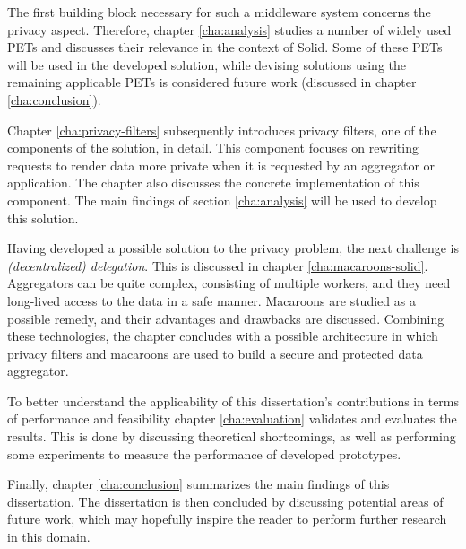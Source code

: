 The first building block necessary for such a middleware system concerns the privacy aspect. Therefore, chapter \ref{cha:analysis} studies a number of widely used \gls{PETs} and discusses their relevance in the context of Solid. Some of these \gls{PETs} will be used in the developed solution, while devising solutions using the remaining applicable \gls{PETs} is considered future work (discussed in chapter \ref{cha:conclusion}).

Chapter \ref{cha:privacy-filters} subsequently introduces privacy filters, one of the components of the solution, in detail. This component focuses on rewriting requests to render data more private when it is requested by an aggregator or application. The chapter also discusses the concrete implementation of this component. The main findings of section \ref{cha:analysis} will be used to develop this solution.

Having developed a possible solution to the privacy problem, the next challenge is \textit{(decentralized) delegation}. This is discussed in chapter \ref{cha:macaroons-solid}. Aggregators can be quite complex, consisting of multiple workers, and they need long-lived access to the data in a safe manner. Macaroons are studied as a possible remedy, and their advantages and drawbacks are discussed. Combining these technologies, the chapter concludes with a possible architecture in which privacy filters and macaroons are used to build a secure and protected data aggregator.

To better understand the applicability of this dissertation's contributions in terms of performance and feasibility chapter \ref{cha:evaluation} validates and evaluates the results. This is done by discussing theoretical shortcomings, as well as performing some experiments to measure the performance of developed prototypes. 

Finally, chapter \ref{cha:conclusion} summarizes the main findings of this dissertation. The dissertation is then concluded by discussing potential areas of future work, which may hopefully inspire the reader to perform further research in this domain.
